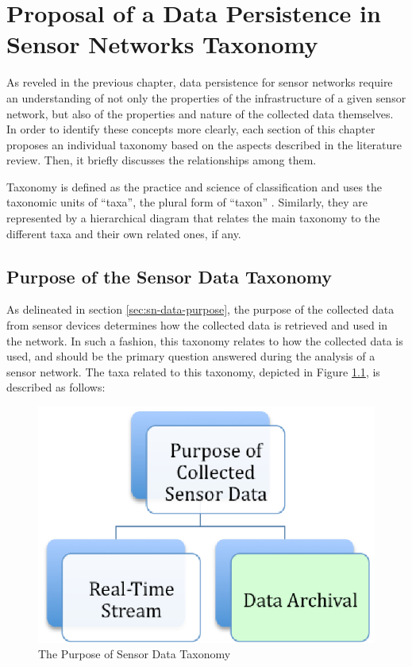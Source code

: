 

\chapter{Proposal of a Data Persistence in Sensor Networks Taxonomy}
\label{chap:taxonomies}

As reveled in the previous chapter, data persistence for sensor
networks require an understanding of not only the properties of the
infrastructure of a given sensor network, but also of the properties and nature
of the collected data themselves. In order to
identify these concepts more clearly, each section of this chapter proposes an
individual taxonomy based on the aspects described in the literature
review. Then, it briefly discusses the relationships among them.

Taxonomy is defined as the practice and science of classification and uses
the taxonomic units of ``taxa'', the plural form of ``taxon'' \cite{taxonomy}.
Similarly, they are represented by a hierarchical diagram that relates the
main taxonomy to the different taxa and their own related ones, if any.

\section{Purpose of the Sensor Data Taxonomy}

As delineated in section \ref{sec:sn-data-purpose}, the purpose of the
collected data from sensor devices determines how the collected data is
retrieved and used in the network. In such a fashion, this taxonomy relates to
how the collected data is used, and should be the primary question answered 
during the analysis of a sensor network. The taxa related to this
taxonomy, depicted in Figure \ref{fig:taxonomy-data-purpose}, is described as
follows:

\begin{figure}[h]
  \centering
  \includegraphics{../diagrams/taxonomy-data-purpose}
  \caption{The Purpose of Sensor Data Taxonomy}
  \label{fig:taxonomy-data-purpose}
\end{figure}

